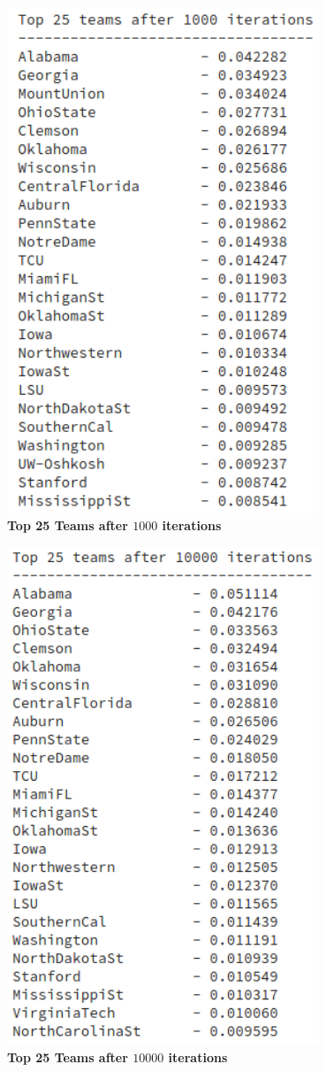 \documentclass[openany,11pt]{homework}
\begin{document}
\begin{center}
	\centering
	\includegraphics[width = 0.70\textwidth]{1b-1000.png}
	\\
	\textbf{Top 25 Teams after $1000$ iterations}
\end{center}

\begin{center}
	\centering
	\includegraphics[width = 0.70\textwidth]{1b-10000.png}
	\\
	\textbf{Top 25 Teams after $10000$ iterations}
\end{center}
\end{document}
